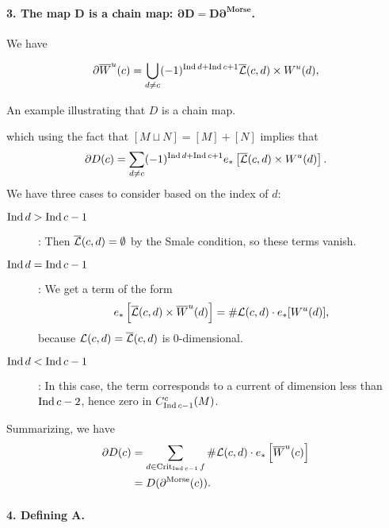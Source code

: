 \begin{myproof}
    \paragraph{3. The map $\bm{D}$ is a chain map:  $\bm{\partial D = D \partial^{\text{Morse}}}$.}
    We have

    \[
        \partial \overline{W}^u(c) = \bigcup_{d \neq c}  (-1)^{\operatorname{Ind} d + \operatorname{Ind} c + 1} \overline{\mathcal L}(c, d) \times  W^u(d),
    \]
    \begin{marginfigure}
        \centering
        \caption{An example illustrating that $D$ is a chain map.}
        \label{fig:d-is-a-chain-map}
    \end{marginfigure}
    which using the fact that $[M \sqcup N] = [M] + [N]$ implies that
    \[
        \partial D(c) = \sum_{d \neq c} (-1)^{\operatorname{Ind} d + \operatorname{Ind} c + 1} e_*\left[\overline{\mathcal L}(c, d) \times  W^u(d)\right]
    .\] 
    We have three cases to consider based on the index of $d$:
    \begin{description}
        \item[$\operatorname{Ind} d > \operatorname{Ind} c-1$]: Then $\overline{\mathcal L}(c, d) = \emptyset$ by the Smale condition, so these terms vanish.
        \item[$\operatorname{Ind} d = \operatorname{Ind} c-1$]: We get a term of the form \[
            e_* \left[\overline{\mathcal L}(c, d) \times \overline{W}^u(d)\right] = \# \mathcal L(c, d) \cdot e_*[W^u(d)],\]
            because $\mathcal L(c, d) = \overline{\mathcal L}(c, d)$ is  $0$-dimensional.
        \item[$\operatorname{Ind} d < \operatorname{Ind} c-1$]: In this case, the term corresponds to a current of dimension less than $\operatorname{Ind} c - 2$, hence zero in $C_{\operatorname{Ind} c - 1}^{c}(M)$.
    \end{description}
    Summarizing, we have
    \begin{align*}
        \partial D(c) &= \sum_{d \in \operatorname{Crit}_{\operatorname{Ind} c - 1} f} \# \mathcal L(c, d) \cdot e_* \left[ \overline{W}^u(c) \right] \\
                      &= D(\partial^{\text{Morse}}(c))
    .\end{align*} 

    \paragraph{4. Defining $\bm{A}$.}


\end{myproof}
